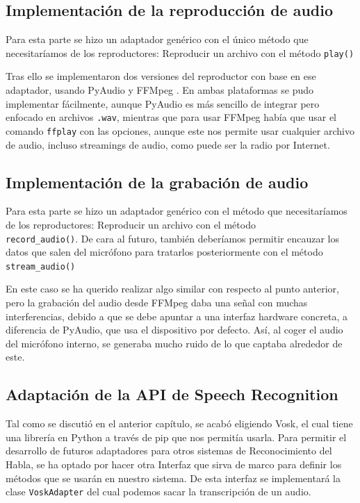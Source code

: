 \subsection{Implementación de la reproducción de audio}
Para esta parte se hizo un adaptador genérico con el único método que necesitaríamos
de los reproductores: Reproducir un archivo con el método \texttt{play()}

Tras ello se implementaron dos versiones del reproductor con base en ese adaptador,
usando PyAudio \cite{pyaudio} y FFMpeg \cite{ffmpeg}. En ambas plataformas se pudo implementar fácilmente, aunque PyAudio es más sencillo de integrar pero enfocado en archivos \texttt{.wav}, mientras que para usar FFMpeg había que usar el comando \texttt{ffplay} con las opciones, aunque este nos permite usar cualquier archivo de audio, incluso streamings de audio, como puede ser la radio por Internet.

\subsection{Implementación de la grabación de audio}
Para esta parte se hizo un adaptador genérico con el método que necesitaríamos
de los reproductores: Reproducir un archivo con el método \\ \texttt{record\_audio()}. De cara al futuro, también deberíamos permitir encauzar los datos que salen del micrófono para tratarlos posteriormente con el método \texttt{stream\_audio()}

En este caso se ha querido realizar algo similar con respecto al punto anterior, pero la grabación del audio desde FFMpeg daba una señal con muchas interferencias, debido a que se debe apuntar a una interfaz hardware concreta, a diferencia de PyAudio, que usa el dispositivo por defecto. Así, al coger el audio del micrófono interno, se generaba mucho ruido de lo que captaba alrededor de este.

\subsection{Adaptación de la API de Speech Recognition}
Tal como se discutió en el anterior capítulo, se acabó eligiendo Vosk\cite{vosk}, el cual tiene una librería en Python a través de pip que nos permitía usarla.
Para permitir el desarrollo de futuros adaptadores para otros sistemas de Reconocimiento del Habla, se ha optado por hacer otra Interfaz que sirva de marco para definir los métodos que se usarán en nuestro sistema.
De esta interfaz se implementará la clase \texttt{VoskAdapter} del cual podemos sacar la transcripción de un audio.

